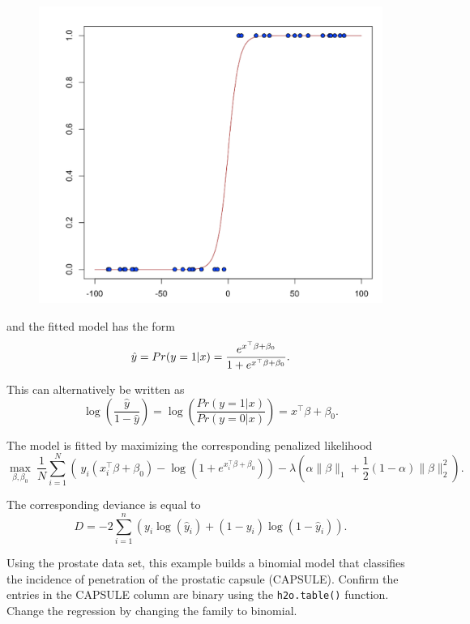 \begin{figure}[h]
\centering
\includegraphics[scale=0.5]{images/scurve.png}
\end{figure}

and the fitted model has the form
$$ \hat{y} = Pr(y = 1|x) = {e^{x^{\top}\beta + \beta_0} \over 1 + e^{x^{\top} \beta + \beta_0} }.$$

This can alternatively be written as 
$$  \log \left( \frac{\hat{y}}{ 1- \hat{y} } \right)  = \log \left(  \frac{Pr(y=1|x)}{Pr(y=0|x)}   \right) = x^{\top} \beta + \beta_0.$$

The model is fitted by maximizing the corresponding penalized likelihood 
$$  \max_{\beta,\beta_0} \   \frac{1}{N} \sum_{i=1}^{N} \left( \ y_i (x_i^{\top}\beta  + \beta_0) - \log (1 + e^{x_i^{\top}\beta  + \beta_0} ) \right)  - \lambda \left( \alpha \|\beta \|_1 +  \frac{1}{2}(1- \alpha)  \| \beta \|_2^2 \right). $$

The corresponding deviance is equal to 
$$D = -2\sum_{i=1}^{n} \left(y_i \log(\hat{y}_i) + (1 - y_i)\log(1-\hat{y}_i)  \right).$$

\waterExampleInR

Using the prostate data set, this example builds a binomial model that classifies the incidence of penetration of the prostatic
capsule (CAPSULE). Confirm the entries in the CAPSULE column are binary using the \texttt{h2o.table()}
function. Change the regression by changing the family to binomial.

